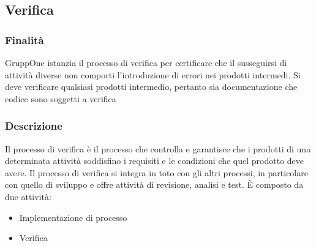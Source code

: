 \documentclass[../norme-di-progetto.tex]{subfiles}
\begin{document}
\subsection{Verifica}%
\label{sub:verifica}

\subsubsection{Finalità}%
\label{subs:verifica/finalita}

GruppOne istanzia il processo di verifica per certificare che il susseguirsi di attività diverse non comporti l'introduzione di errori nei prodotti intermedi.
Si deve verificare qualsiasi prodotti intermedio, pertanto sia documentazione che codice sono soggetti a verifica

\subsubsection{Descrizione}%
\label{subs:verifica/descrizione}


Il processo di verifica è il processo che controlla e garantisce che i prodotti di una determinata attività soddisfino i requisiti e le condizioni che quel prodotto deve avere. Il processo di verifica si integra in toto con gli altri processi, in particolare con quello di sviluppo e offre attività di revisione, analisi e test. È composto da due attività:

\begin{itemize}
  \item Implementazione di processo
  \item Verifica
\end{itemize}
\end{document}
